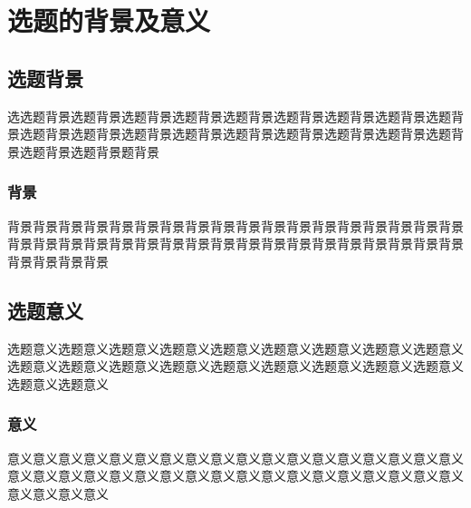 \section{选题的背景及意义}

\subsection{选题背景}

选选题背景选题背景选题背景选题背景选题背景选题背景选题背景选题背景选题背景选题背景选题背景选题背景选题背景选题背景选题背景选题背景选题背景选题背景选题背景选题背景题背景

\subsubsection{背景}

背景背景背景背景背景背景背景背景背景背景背景背景背景背景背景背景背景背景背景背景背景背景背景背景背景背景背景背景背景背景背景背景背景背景背景背景背景背景背景背景

\subsection{选题意义}

选题意义选题意义选题意义选题意义选题意义选题意义选题意义选题意义选题意义选题意义选题意义选题意义选题意义选题意义选题意义选题意义选题意义选题意义选题意义选题意义

\subsubsection{意义}

意义意义意义意义意义意义意义意义意义意义意义意义意义意义意义意义意义意义意义意义意义意义意义意义意义意义意义意义意义意义意义意义意义意义意义意义意义意义意义意义